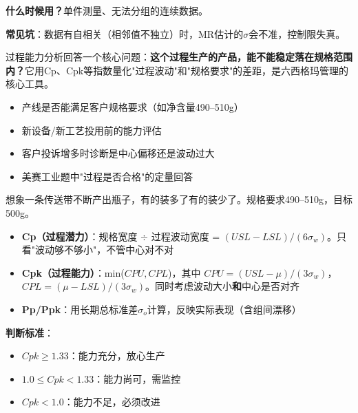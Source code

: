 \begin{algonotes}
\textbf{什么时候用？}单件测量、无法分组的连续数据。

\textbf{常见坑}：数据有自相关（相邻值不独立）时，MR估计的$\sigma$会不准，控制限失真。
\end{algonotes}


\begin{algointro}
过程能力分析回答一个核心问题：\textbf{这个过程生产的产品，能不能稳定落在规格范围内？}它用Cp、Cpk等指数量化"过程波动"和"规格要求"的差距，是六西格玛管理的核心工具。
\end{algointro}

\begin{algoscene}
\begin{itemize}
    \item 产线是否能满足客户规格要求（如净含量490--510g）
    \item 新设备/新工艺投用前的能力评估
    \item 客户投诉增多时诊断是中心偏移还是波动过大
    \item 美赛工业题中"过程是否合格"的定量回答
\end{itemize}
\end{algoscene}

\begin{algoprinciple}
想象一条传送带不断产出瓶子，有的装多了有的装少了。规格要求490--510g，目标500g。

\begin{itemize}
    \item \textbf{Cp（过程潜力）}：规格宽度 $\div$ 过程波动宽度 = $(USL-LSL)/(6\sigma_w)$。只看"波动够不够小"，不管中心对不对
    \item \textbf{Cpk（过程能力）}：min($CPU, CPL$)，其中 $CPU=(USL-\mu)/(3\sigma_w)$，$CPL=(\mu-LSL)/(3\sigma_w)$。同时考虑波动大小\textbf{和}中心是否对齐
    \item \textbf{Pp/Ppk}：用长期总标准差$\sigma_o$计算，反映实际表现（含组间漂移）
\end{itemize}

\textbf{判断标准}：
\begin{itemize}
    \item $Cpk \geq 1.33$：能力充分，放心生产
    \item $1.0 \leq Cpk < 1.33$：能力尚可，需监控
    \item $Cpk < 1.0$：能力不足，必须改进
\end{itemize}
\end{algoprinciple}

